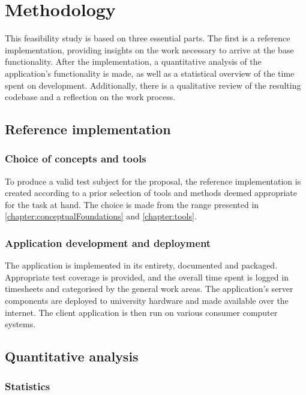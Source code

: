 \chapter{Methodology}
\label{chapter:methodology}

This feasibility study is based on three essential parts. The first is a reference implementation, providing insights on the work necessary to arrive at the base functionality. After the implementation, a quantitative analysis of the application's functionality is made, as well as a statistical overview of the time spent on development. Additionally, there is a qualitative review of the resulting codebase and a reflection on the work process.

\section{Reference implementation}

\subsection{Choice of concepts and tools}

To produce a valid test subject for the proposal, the reference implementation is created according to a prior selection of tools and methods deemed appropriate for the task at hand. The choice is made from the range presented in \autoref{chapter:conceptualFoundations} and \autoref{chapter:tools}.

\subsection{Application development and deployment}

The application is implemented in its entirety, documented and packaged. Appropriate test coverage is provided, and the overall time spent is logged in timesheets and categorised by the general work areas. The application's server components are deployed to university hardware and made available over the internet. The client application is then run on various consumer computer systems.

\section{Quantitative analysis}


\subsection{Statistics}


